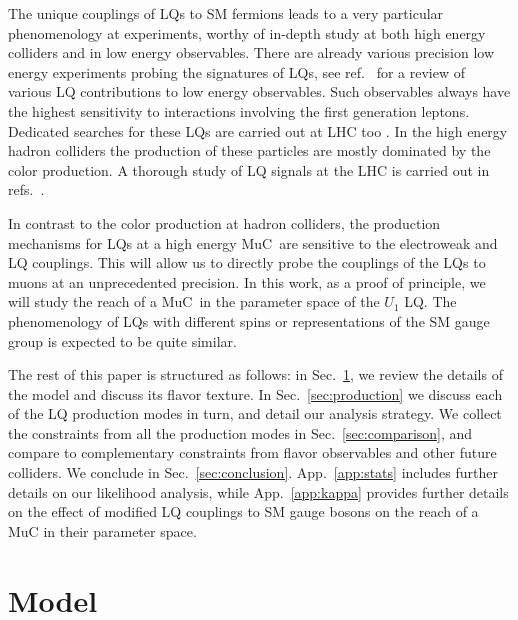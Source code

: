 \documentclass[a4paper,11pt]{article}
\newcommand{\muc}{MuC}
\begin{document}
The unique couplings of LQs to SM fermions leads to a very particular phenomenology at experiments, worthy of in-depth study at both high energy colliders and in low energy observables. There are already various precision low energy experiments probing the signatures of LQs, see ref.~\cite{Dorsner:2016wpm} for a review of various LQ contributions to low energy observables. Such observables always have the highest sensitivity to interactions involving the first generation leptons. Dedicated searches for these LQs are carried out at LHC too \cite{Aaboud:2016qeg, Sirunyan:2017yrk, Sirunyan:2018jdk, Sirunyan:2018ryt, Sirunyan:2018vhk, Sirunyan:2018btu, Sirunyan:2018xtm, Aaboud:2019jcc, Aaboud:2019bye, Aad:2020sgw, Aad:2020iuy, Aad:2020jmj, Sirunyan:2020zbk, Aad:2021rrh, Aad:2021jmg}. In the high energy hadron colliders the production of these particles are mostly dominated by the color production. A thorough study of LQ signals at the LHC is carried out in refs.~\cite{Diaz:2017lit, Bansal:2018eha, Angelescu:2018tyl, Schmaltz:2018nls, Bansal:2018nwp}. 

In contrast to the color production at hadron colliders, the production mechanisms for LQs at a high energy \muc~are sensitive to the electroweak and LQ couplings.
This will allow us to directly probe the couplings of the LQs to muons at an unprecedented precision. 
In this work, as a proof of principle, we will study the reach of a \muc~in the parameter space of the $U_1$ LQ. 
The phenomenology of LQs with different spins or representations of the SM gauge group is expected to be quite similar.




The rest of this paper is structured as follows: in Sec.~\ref{sec:model}, we review the details of the model and discuss its flavor texture. In Sec.~\ref{sec:production} we discuss each of the LQ production modes in turn, and detail our analysis strategy. We collect the constraints from all the production modes in Sec.~\ref{sec:comparison}, and compare to complementary constraints from flavor observables and other future colliders. We conclude in Sec.~\ref{sec:conclusion}. App.~\ref{app:stats} includes further details on our likelihood analysis, while App.~\ref{app:kappa} provides further details on the effect of modified LQ couplings to SM gauge bosons on the reach of a \muc{} in their parameter space.



\section{Model}
\label{sec:model}
\end{document}
